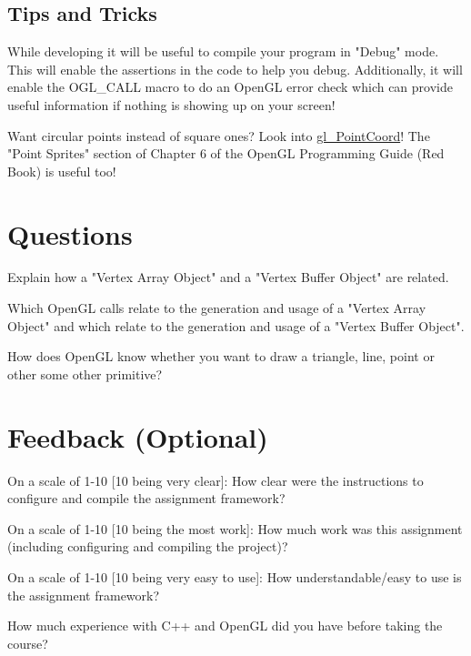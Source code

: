 \documentclass{article}
\begin{document}
\subsection*{Tips and Tricks}
\begin{itemize*}
\item While developing it will be useful to compile your program in "Debug" mode. This will enable the assertions in the code to help you debug. Additionally, it will enable the OGL\_CALL macro to do an OpenGL error check which can provide useful information if nothing is showing up on your screen!
\item Want circular points instead of square ones? Look into \href{https://www.opengl.org/sdk/docs/man/html/gl_PointCoord.xhtml}{gl\_PointCoord}! The "Point Sprites" section of Chapter 6 of the OpenGL Programming Guide (Red Book) is useful too!
\end{itemize*}

\section*{Questions}
\begin{enumerate*}
\item Explain how a "Vertex Array Object" and a "Vertex Buffer Object" are related.
\item Which OpenGL calls relate to the generation and usage of a "Vertex Array Object" and which relate to the generation and usage of a "Vertex Buffer Object".
\item How does OpenGL know whether you want to draw a triangle, line, point or other some other primitive?
\end{enumerate*}

\section*{Feedback (Optional)}
\begin{enumerate*}
\item On a scale of 1-10 [10 being very clear]: How clear were the instructions to configure and compile the assignment framework?
\item On a scale of 1-10 [10 being the most work]: How much work was this assignment (including configuring and compiling the project)?
\item On a scale of 1-10 [10 being very easy to use]: How understandable/easy to use is the assignment framework?
\item How much experience with C++ and OpenGL did you have before taking the course?
\end{enumerate*}
\end{document}

